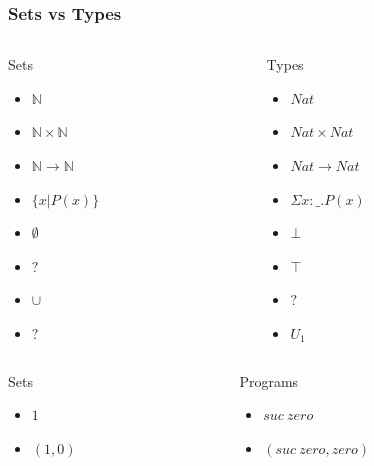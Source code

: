 \documentclass[10pt]{beamer}
\begin{document}
\begin{frame}
\frametitle{Sets vs Types}
\begin{columns}

\begin{column}{0.4 \textwidth}
\begin{exampleblock}{Sets}
  \begin{itemize}
    \item $\mathbb{N}$
    \item $\mathbb{N} \times \mathbb{N}$
    \item $\mathbb{N} \to \mathbb{N}$
    \item $\{x|P(x)\}$
    \item $\emptyset$
    \item $?$
    \item $\cup$
    \item $?$
  \end{itemize}
\end{exampleblock}
\end{column}

\begin{column}{0.4 \textwidth}
\begin{block}{Types}
  \begin{itemize}
    \item $Nat$
    \item $Nat \times Nat$
    \item $Nat \to Nat$
    \item $\Sigma x : \_ . P(x)$
    \item $\bot$
    \item $\top$
    \item $?$
    \item $U_1$
  \end{itemize}
\end{block}
\end{column}
\end{columns}

\begin{columns}

\begin{column}{0.4 \textwidth}
\begin{exampleblock}{Sets}
  \begin{itemize}
    \item $1$
    \item $(1,0)$
  \end{itemize}
\end{exampleblock}
\end{column}

\begin{column}{0.4 \textwidth}
\begin{block}{Programs}
  \begin{itemize}
    \item $suc\ zero$
    \item $(suc\ zero, zero)$
  \end{itemize}
\end{block}
\end{column}
\end{columns}

\end{frame}
\end{document}
